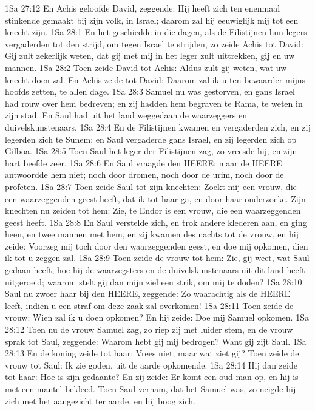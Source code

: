 1Sa 27:12  En Achis geloofde David, zeggende: Hij heeft zich ten enenmaal stinkende gemaakt bij zijn volk, in Israel; daarom zal hij eeuwiglijk mij tot een knecht zijn.
1Sa 28:1  En het geschiedde in die dagen, als de Filistijnen hun legers vergaderden tot den strijd, om tegen Israel te strijden, zo zeide Achis tot David: Gij zult zekerlijk weten, dat gij met mij in het leger zult uittrekken, gij en uw mannen.
1Sa 28:2  Toen zeide David tot Achis: Aldus zult gij weten, wat uw knecht doen zal. En Achis zeide tot David: Daarom zal ik u ten bewaarder mijns hoofds zetten, te allen dage.
1Sa 28:3  Samuel nu was gestorven, en gans Israel had rouw over hem bedreven; en zij hadden hem begraven te Rama, te weten in zijn stad. En Saul had uit het land weggedaan de waarzeggers en duivelskunstenaars.
1Sa 28:4  En de Filistijnen kwamen en vergaderden zich, en zij legerden zich te Sunem; en Saul vergaderde gans Israel, en zij legerden zich op Gilboa.
1Sa 28:5  Toen Saul het leger der Filistijnen zag, zo vreesde hij, en zijn hart beefde zeer.
1Sa 28:6  En Saul vraagde den HEERE; maar de HEERE antwoordde hem niet; noch door dromen, noch door de urim, noch door de profeten.
1Sa 28:7  Toen zeide Saul tot zijn knechten: Zoekt mij een vrouw, die een waarzeggenden geest heeft, dat ik tot haar ga, en door haar onderzoeke. Zijn knechten nu zeiden tot hem: Zie, te Endor is een vrouw, die een waarzeggenden geest heeft.
1Sa 28:8  En Saul verstelde zich, en trok andere klederen aan, en ging heen, en twee mannen met hem, en zij kwamen des nachts tot de vrouw, en hij zeide: Voorzeg mij toch door den waarzeggenden geest, en doe mij opkomen, dien ik tot u zeggen zal.
1Sa 28:9  Toen zeide de vrouw tot hem: Zie, gij weet, wat Saul gedaan heeft, hoe hij de waarzegsters en de duivelskunstenaars uit dit land heeft uitgeroeid; waarom stelt gij dan mijn ziel een strik, om mij te doden?
1Sa 28:10  Saul nu zwoer haar bij den HEERE, zeggende: Zo waarachtig als de HEERE leeft, indien u een straf om deze zaak zal overkomen!
1Sa 28:11  Toen zeide de vrouw: Wien zal ik u doen opkomen? En hij zeide: Doe mij Samuel opkomen.
1Sa 28:12  Toen nu de vrouw Samuel zag, zo riep zij met luider stem, en de vrouw sprak tot Saul, zeggende: Waarom hebt gij mij bedrogen? Want gij zijt Saul.
1Sa 28:13  En de koning zeide tot haar: Vrees niet; maar wat ziet gij? Toen zeide de vrouw tot Saul: Ik zie goden, uit de aarde opkomende.
1Sa 28:14  Hij dan zeide tot haar: Hoe is zijn gedaante? En zij zeide: Er komt een oud man op, en hij is met een mantel bekleed. Toen Saul vernam, dat het Samuel was, zo neigde hij zich met het aangezicht ter aarde, en hij boog zich.
